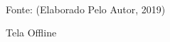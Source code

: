 \begin{figure}[!htpb]
	\centering
	\caption{Tela Offline}
	\\
	Fonte: (Elaborado Pelo Autor, 2019)
	\label{offline}
\end{figure}

